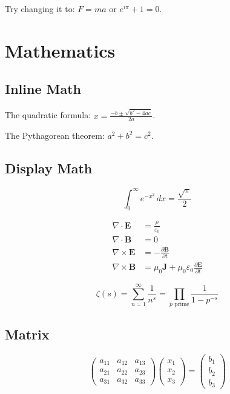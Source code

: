 \documentclass[12pt,a4paper]{article}
\begin{document}
Try changing it to: $F = ma$ or $e^{i\pi} + 1 = 0$.

\section{Mathematics}
\label{sec:math}

\subsection{Inline Math}

The quadratic formula: $x = \frac{-b \pm \sqrt{b^{2} - 4ac}}{2a}$.

The Pythagorean theorem: $a^{2} + b^{2} = c^{2}$.

\subsection{Display Math}

\begin{equation}
  \int_{0}^{\infty} e^{-x^{2}} \, dx = \frac{\sqrt{\pi}}{2}
  \label{eq:gaussian}
\end{equation}

\begin{align}
  \nabla \cdot \mathbf{E} &= \frac{\rho}{\varepsilon_{0}} \\
  \nabla \cdot \mathbf{B} &= 0 \\
  \nabla \times \mathbf{E} &= -\frac{\partial \mathbf{B}}{\partial t} \\
  \nabla \times \mathbf{B} &= \mu_{0}\mathbf{J} +
    \mu_{0}\varepsilon_{0}\frac{\partial \mathbf{E}}{\partial t}
  \label{eq:maxwell}
\end{align}

\begin{equation}
  \zeta(s) = \sum_{n=1}^{\infty} \frac{1}{n^{s}} =
    \prod_{p \text{ prime}} \frac{1}{1 - p^{-s}}
  \label{eq:zeta}
\end{equation}

\subsection{Matrix}

\begin{equation}
  \begin{pmatrix}
    a_{11} & a_{12} & a_{13} \\
    a_{21} & a_{22} & a_{23} \\
    a_{31} & a_{32} & a_{33}
  \end{pmatrix}
  \begin{pmatrix} x_{1} \\ x_{2} \\ x_{3} \end{pmatrix}
  =
  \begin{pmatrix} b_{1} \\ b_{2} \\ b_{3} \end{pmatrix}
  \label{eq:matrix}
\end{equation}
\end{document}
